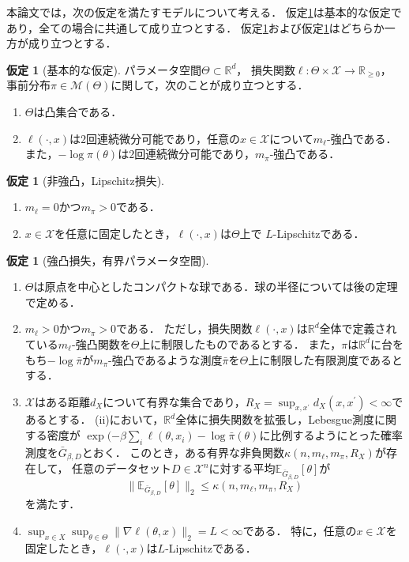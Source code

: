 \documentclass{jarticle}
\theoremstyle{definition}
\newtheorem{asm}[thm]{仮定}
\begin{document}
本論文では，次の仮定を満たすモデルについて考える．
仮定\ref{asm:1}は基本的な仮定であり，全ての場合に共通して成り立つとする．
仮定\ref{asm:2}および仮定\ref{asm:3}はどちらか一方が成り立つとする．
\begin{asm}[基本的な仮定]
\label{asm:1}
パラメータ空間$\Theta \subset \mathbb{R}^d$，
損失関数$\ell: \Theta \times \mathcal{X} \to \mathbb{R}_{\geq 0}$，
事前分布$\pi \in \mathcal{M}(\Theta)$に関して，次のことが成り立つとする．
\begin{enumerate}
\renewcommand{\labelenumi}{(\roman{enumi})}
\item $\Theta$は凸集合である． 
\item $\ell(\cdot, x)$は$2$回連続微分可能であり，任意の$x \in \mathcal{X}$について$m_\ell$-強凸である．
また，$-\log \pi(\theta)$は$2$回連続微分可能であり，$m_\pi$-強凸である．
\end{enumerate}
\end{asm}
\begin{asm}[非強凸，Lipschitz損失]
\label{asm:2}
\begin{enumerate}
\renewcommand{\labelenumi}{(\roman{enumi})}
\item $m_\ell=0$かつ$m_\pi > 0$である．
\item $x \in \mathcal{X}$を任意に固定したとき，$\ell(\cdot, x)$は$\Theta$上で
$L$-Lipschitzである．
\end{enumerate}
\end{asm}
\begin{asm}[強凸損失，有界パラメータ空間]
\label{asm:3}
\begin{enumerate}
\renewcommand{\labelenumi}{(\roman{enumi})}
\item $\Theta$は原点を中心としたコンパクトな球である．球の半径については後の定理で定める．
\item $m_\ell > 0$かつ$m_\pi > 0$である．
ただし，損失関数$\ell(\cdot, x)$は$\mathbb{R}^d$全体で定義されている$m_\ell$-強凸関数を$\Theta$上に制限したものであるとする．
また，$\pi$は$\mathbb{R}^d$に台をもち$-\log\bar{\pi}$が$m_\pi$-強凸であるような測度$\bar{\pi}$を$\Theta$上に制限した有限測度であるとする．
\item $\mathcal{X}$はある距離$d_X$について有界な集合であり，$R_X=\sup_{x, x^\prime} d_X(x, x^\prime)<\infty$であるとする．
(ii)において，$\mathbb{R}^d$全体に損失関数を拡張し，Lebesgue測度に関する密度が
$\exp(-\beta \sum_{i} \ell(\theta, x_i) - \log \bar{\pi}(\theta)$に比例するようにとった確率測度を$\bar{G}_{\beta, D}$とおく．
このとき，ある有界な非負関数$\kappa(n, m_\ell, m_\pi, R_X)$が存在して，
任意のデータセット$D\in \mathcal{X}^n$に対する平均$\mathbb{E}_{\bar{G}_{\beta,D}}[\theta]$が
\begin{equation}
\parallel \mathbb{E}_{\bar{G}_{\beta,D}}[\theta] \parallel_2 \leq \kappa(n, m_\ell, m_\pi, R_X)
\end{equation}
を満たす．
\item $\sup_{x \in X} \sup_{\theta \in \Theta} \parallel \nabla \ell(\theta, x) \parallel_2 = L < \infty$である．
特に，任意の$x\in \mathcal{X}$を固定したとき，$\ell(\cdot, x)$は$L$-Lipschitzである．
\end{enumerate}
\end{asm}
\end{document}
